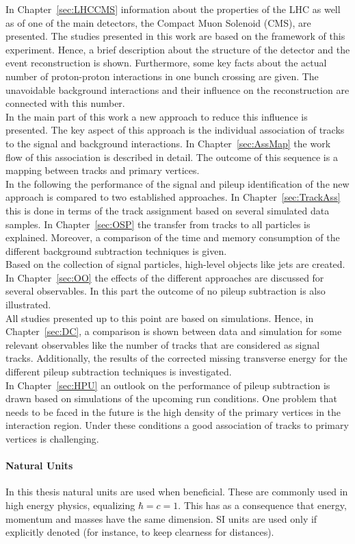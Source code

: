 In Chapter~\ref{sec:LHCCMS} information about the properties of the LHC as well as of one of the main detectors, the Compact Muon Solenoid (CMS), are presented. The studies presented in this work are based on the framework of this experiment. Hence, a brief description about the structure of the detector and the event reconstruction is shown. Furthermore, some key facts about the actual number of proton-proton interactions in one bunch crossing are given. The unavoidable background interactions and their influence on the reconstruction are connected with this number. \\
In the main part of this work a new approach to reduce this influence is presented. The key aspect of this approach is the individual association of tracks to the signal and background interactions. In Chapter~\ref{sec:AssMap} the work flow of this association is described in detail. The outcome of this sequence is a mapping between tracks and primary vertices. \\
In the following the performance of the signal and pileup identification of the new approach is compared to two established approaches. In Chapter~\ref{sec:TrackAss} this is done in terms of the track assignment based on several simulated data samples. In Chapter~\ref{sec:OSP} the transfer from tracks to all particles is explained. Moreover, a comparison of the time and memory consumption of the different background subtraction techniques is given. \\
Based on the collection of signal particles, high-level objects like jets are created. In Chapter~\ref{sec:OO} the effects of the different approaches are discussed for several observables. In this part the outcome of no pileup subtraction is also illustrated. \\
All studies presented up to this point are based on simulations. Hence, in Chapter~\ref{sec:DC}, a comparison is shown between data and simulation for some relevant observables like the number of tracks that are considered as signal tracks. Additionally, the results of the corrected missing transverse energy for the different pileup subtraction techniques is investigated. \\
In Chapter~\ref{sec:HPU} an outlook on the performance of pileup subtraction is drawn based on simulations of the upcoming run conditions. One problem that needs to be faced in the future is the high density of the primary vertices in the interaction region. Under these conditions a good association of tracks to primary vertices is challenging.

\paragraph*{Natural Units}

In this thesis natural units are used when beneficial. These are commonly used in high energy physics, equalizing $\hbar{} = c = 1$. This has as a consequence that energy, momentum and masses have the same dimension. SI units are used only if explicitly denoted (for instance, to keep clearness for distances).
